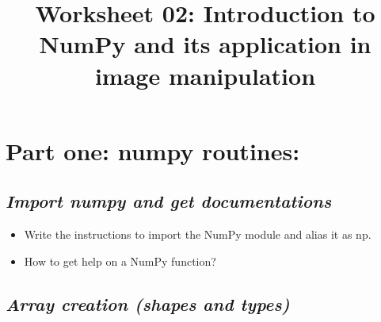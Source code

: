 \documentclass[11pt]{article}
\title{Worksheet 02: Introduction to NumPy and its application in image manipulation }
\date{}
\begin{document}
    
    \maketitle
    
    

    
    \hypertarget{part-one-numpy-routines}{%
\section*{\center Part one: numpy routines:}\label{part-one-numpy-routines}}

  \hypertarget{import-numpy-and-get-documentations}{%
  \subsection{\texorpdfstring{\emph{Import numpy and get
  documentations}}{Import numpy and get documentations}}\label{import-numpy-and-get-documentations}}

  \begin{itemize}
  \item
    Write the instructions to import the NumPy module and alias it as
    np.
  \item
    How to get help on a NumPy function?
  \end{itemize}
  \hypertarget{array-creation-shapes-and-types}{%
  \subsection{\texorpdfstring{\emph{Array creation (shapes and
  types)}}{Array creation (shapes and types)}}\label{array-creation-shapes-and-types}}
\end{document}
